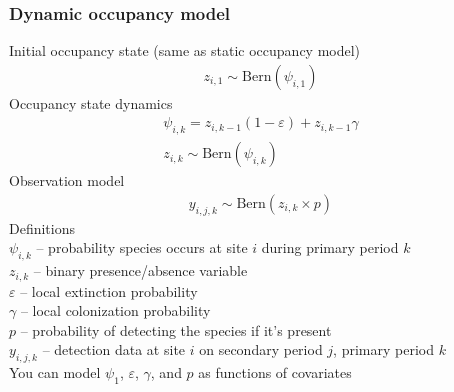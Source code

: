 \documentclass[color=usenames,dvipsnames]{beamer}\usepackage[]{graphicx}\usepackage[]{color}
\begin{document}
\begin{frame}
  \frametitle{Dynamic occupancy model}
  \small
  Initial occupancy state (same as static occupancy model)
  \begin{gather*}
    z_{i,1} \sim \mathrm{Bern}(\psi_{i,1})
  \end{gather*}
  \pause
  Occupancy state dynamics
  \begin{gather*}
    \psi_{i,k} = z_{i,k-1}(1-\varepsilon) +  z_{i,k-1}\gamma \\
    z_{i,k} \sim \mathrm{Bern}(\psi_{i,k})
  \end{gather*}
  \pause
  Observation model
  \begin{gather*}
    y_{i,j,k} \sim \mathrm{Bern}(z_{i,k}\times p)
  \end{gather*}
  \pause
  Definitions \\
  \footnotesize
  $\psi_{i,k}$ -- probability species occurs at site $i$ during primary period $k$ \\
  $z_{i,k}$ -- binary presence/absence variable \\
  $\varepsilon$ -- local extinction probability \\
  $\gamma$ -- local colonization probability \\
  $p$ -- probability of detecting the species if it's present \\
  $y_{i,j,k}$ -- detection data at site $i$ on secondary period $j$, primary period $k$ \\
  \pause \vfill
  \centering
  \small
  You can model $\psi_1$, $\varepsilon$, $\gamma$, and $p$ as
  functions of covariates \\
\end{frame}


\end{document}
